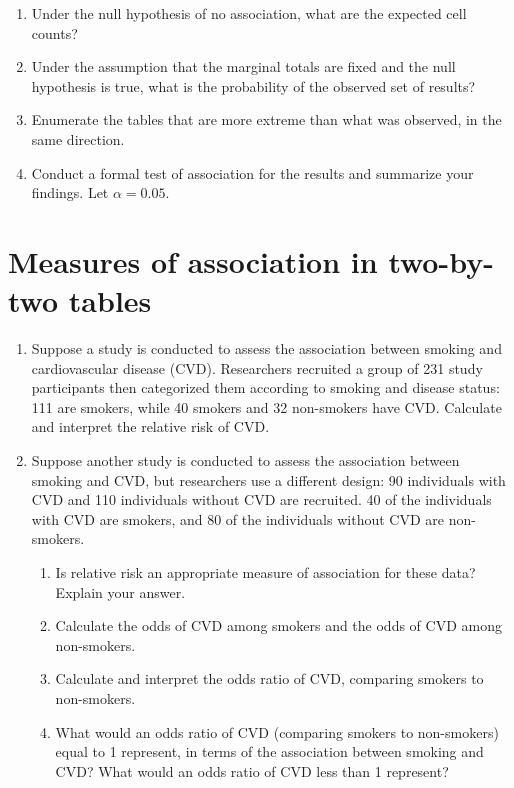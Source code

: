 \documentclass[letterpaper,12pt,twoside,]{pinp}
\begin{document}
\begin{enumerate}
  \begin{enumerate}
  \def\labelenumii{\alph{enumii})}
  \item
    Under the null hypothesis of no association, what are the expected
    cell counts?
  \item
    Under the assumption that the marginal totals are fixed and the null
    hypothesis is true, what is the probability of the observed set of
    results?
  \item
    Enumerate the tables that are more extreme than what was observed,
    in the same direction.
  \item
    Conduct a formal test of association for the results and summarize
    your findings. Let \(\alpha = 0.05\).
  \end{enumerate}
\end{enumerate}

\hypertarget{measures-of-association-in-two-by-two-tables}{%
\section{Measures of association in two-by-two
tables}\label{measures-of-association-in-two-by-two-tables}}

\begin{enumerate}
\def\labelenumi{\arabic{enumi}.}
\setcounter{enumi}{6}
\item
  Suppose a study is conducted to assess the association between smoking
  and cardiovascular disease (CVD). Researchers recruited a group of 231
  study participants then categorized them according to smoking and
  disease status: 111 are smokers, while 40 smokers and 32 non-smokers
  have CVD. Calculate and interpret the relative risk of CVD.
\item
  Suppose another study is conducted to assess the association between
  smoking and CVD, but researchers use a different design: 90
  individuals with CVD and 110 individuals without CVD are recruited. 40
  of the individuals with CVD are smokers, and 80 of the individuals
  without CVD are non-smokers.

  \begin{enumerate}
  \def\labelenumii{\alph{enumii})}
  \item
    Is relative risk an appropriate measure of association for these
    data? Explain your answer.
  \item
    Calculate the odds of CVD among smokers and the odds of CVD among
    non-smokers.
  \item
    Calculate and interpret the odds ratio of CVD, comparing smokers to
    non-smokers.
  \item
    What would an odds ratio of CVD (comparing smokers to non-smokers)
    equal to 1 represent, in terms of the association between smoking
    and CVD? What would an odds ratio of CVD less than 1 represent?
  \end{enumerate}
\end{enumerate}





\end{document}
